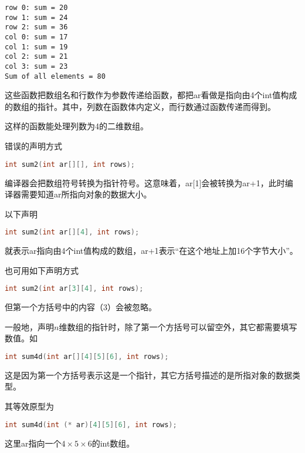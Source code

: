 \begin{frame}[fragile]
\begin{lstlisting}[backgroundcolor=\color{red!20}]
row 0: sum = 20
row 1: sum = 24
row 2: sum = 36
col 0: sum = 17
col 1: sum = 19
col 2: sum = 21
col 3: sum = 23
Sum of all elements = 80
\end{lstlisting}
\end{frame}


\begin{frame}[fragile]
这些函数把数组名和行数作为参数传递给函数，都把ar看做是指向由4个{\tf int}值构成的数组的指针。其中，列数在函数体内定义，而行数通过函数传递而得到。\vspace{0.1in}

\textcolor{acolor1}{这样的函数能处理列数为4的二维数组。}
\end{frame}


\begin{frame}[fragile]
错误的声明方式
\begin{lstlisting}[language=c,backgroundcolor=\color{red!20}]
int sum2(int ar[][], int rows);
\end{lstlisting}
\textcolor{acolor1}{编译器会把数组符号转换为指针符号。}这意味着，{\tf ar[1]}会被转换为{\tf ar+1}，此时编译器需要知道{\tf ar}所指向对象的数据大小。\pause \vspace{0.15in}

以下声明
\begin{lstlisting}[language=c,backgroundcolor=\color{red!20}]
int sum2(int ar[][4], int rows);
\end{lstlisting}
就表示{\tf ar}指向由4个{\tf int}值构成的数组，{\tf ar+1}表示“在这个地址上加16个字节大小”。
\end{frame}


\begin{frame}[fragile]
也可用如下声明方式
\begin{lstlisting}[language=c,backgroundcolor=\color{red!20}]
int sum2(int ar[3][4], int rows);
\end{lstlisting}
但第一个方括号中的内容（3）会被忽略。
\end{frame}


\begin{frame}[fragile]
一般地，声明$n$维数组的指针时，除了第一个方括号可以留空外，其它都需要填写数值。如
\begin{lstlisting}[language=c,backgroundcolor=\color{red!20}]
int sum4d(int ar[][4][5][6], int rows);
\end{lstlisting}
这是因为第一个方括号表示这是一个指针，其它方括号描述的是所指对象的数据类型。
\pause \vspace{0.15in}

其等效原型为
\begin{lstlisting}[language=c,backgroundcolor=\color{red!20}]
int sum4d(int (* ar)[4][5][6], int rows);
\end{lstlisting}
这里{\tf ar}指向一个$4\times5\times6$的{\tf int}数组。
\end{frame}
